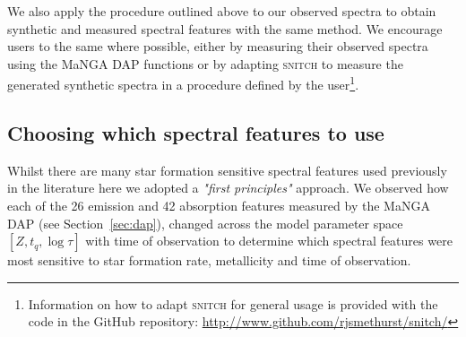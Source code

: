 \documentclass[useAMS,usenatbib]{mn2e}
\begin{document}
We also apply the procedure outlined above to our observed spectra to obtain synthetic and measured spectral features with the same method. We encourage users to the same where possible, either by measuring their observed spectra using the MaNGA DAP functions or by adapting \textsc{snitch} to measure the generated synthetic spectra in a procedure defined by the user\footnote{Information on how to adapt \textsc{snitch} for general usage is provided with the code in the GitHub repository: \url{http://www.github.com/rjsmethurst/snitch/}}.

\subsection{Choosing which spectral features to use}\label{sec:choosespf}

Whilst there are many star formation sensitive spectral features used previously in the literature \citep[see comprehensive review by][]{kennevans12} here we adopted a \emph{"first principles"} approach. We observed how each of the 26 emission and 42 absorption features measured by the MaNGA DAP (see Section~\ref{sec:dap}), changed across the model parameter space $[Z, t_q, \log \tau]$ with time of observation to determine which spectral features were most sensitive to star formation rate, metallicity and time of observation. 
\end{document}
